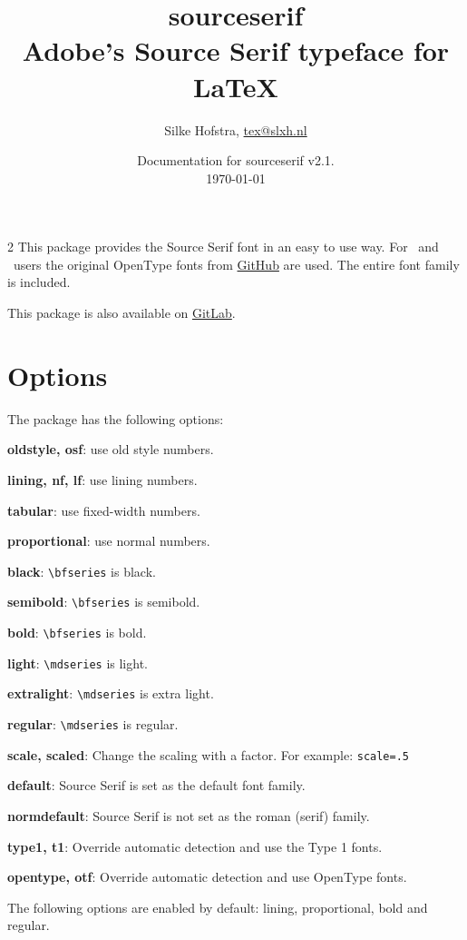 \documentclass[10pt,a4paper,english]{article}
\title{\bfseries
	\Huge sourceserif\\
	\Large Adobe's Source Serif typeface for \LaTeX
}
\author{Silke Hofstra, \href{mailto:tex@slxh.nl}{tex@slxh.nl}}
\date{Documentation for sourceserif v2.1.\\ \today}
\begin{document}
\maketitle
\begin{multicols}{2}
This package provides the Source Serif font in an easy to use way. For \XeLaTeX\ and \LuaLaTeX\ users the original OpenType fonts from \href{https://github.com/adobe-fonts/source-serif}{GitHub} are used. The entire font family is included.

This package is also available on \href{https://gitlab.com/slxh/latex/sourceserif}{GitLab}.

\section{Options}
The package has the following options:
\begin{itemize*}
	\item \textbf{oldstyle, osf}:  use old style numbers.
	\item \textbf{lining, nf, lf}: use lining numbers.
	\item \textbf{tabular}:        use fixed-width numbers.
	\item \textbf{proportional}:   use normal numbers.
	\item \textbf{black}:          \texttt{\textbackslash bfseries} is black.
	\item \textbf{semibold}:       \texttt{\textbackslash bfseries} is semibold.
	\item \textbf{bold}:           \texttt{\textbackslash bfseries} is bold.
	\item \textbf{light}:          \texttt{\textbackslash mdseries} is light.
	\item \textbf{extralight}:     \texttt{\textbackslash mdseries} is extra light.
	\item \textbf{regular}:        \texttt{\textbackslash mdseries} is regular.
	\item \textbf{scale, scaled}:  Change the scaling with a factor. For example: \texttt{scale=.5}
	\item \textbf{default}:        Source Serif is set as the default font family.
	\item \textbf{normdefault}:    Source Serif is not set as the roman (serif) family.
	\item \textbf{type1, t1}:      Override automatic detection and use the Type 1 fonts.
	\item \textbf{opentype, otf}:  Override automatic detection and use OpenType fonts.
\end{itemize*}
The following options are enabled by default: lining, proportional, bold and regular.


\end{multicols}
\end{document}

